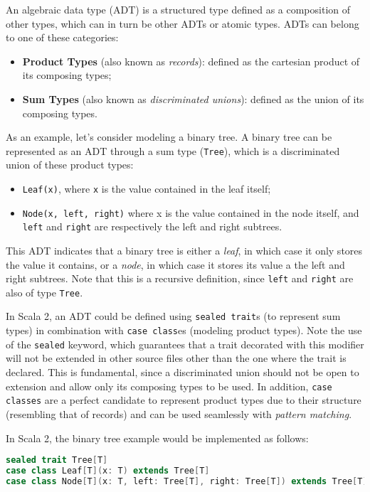 An algebraic data type (ADT) is a structured type defined as a composition of other types, which can in turn be other ADTs or atomic types.
%
ADTs can belong to one of these categories:
%
\begin{itemize}
    \item \textbf{Product Types} (also known as \textit{records}): defined as the cartesian product of its composing types;
    \item \textbf{Sum Types} (also known as \textit{discriminated unions}): defined as the union of its composing types.
\end{itemize}
%
As an example, let's consider modeling a binary tree.
%
A binary tree can be represented as an ADT through a sum type (\texttt{Tree}), which is a discriminated union of these product types:
%
\begin{itemize}
    \item \texttt{Leaf(x)}, where \texttt{x} is the value contained in the leaf itself;
    \item \texttt{Node(x, left, right)} where x is the value contained in the node itself, and \texttt{left} and \texttt{right} are respectively the left and right subtrees.
\end{itemize}
%
This ADT indicates that a binary tree is either a \textit{leaf}, in which case it only stores the value it contains, or a \textit{node}, in which case it stores its value a the left and right subtrees.
%
Note that this is a recursive definition, since \texttt{left} and \texttt{right} are also of type \texttt{Tree}.

In Scala 2, an ADT could be defined using \texttt{sealed trait}s (to represent sum types) in combination with \texttt{case class}es (modeling product types).
%
Note the use of the \texttt{sealed} keyword, which guarantees that a trait decorated with this modifier will not be extended in other source files other than the one where the trait is declared.
%
This is fundamental, since a discriminated union should not be open to extension and allow only its composing types to be used.
%
In addition, \texttt{case classes} are a perfect candidate to represent product types due to their structure (resembling that of records) and can be used seamlessly with \textit{pattern matching}.

In Scala 2, the binary tree example would be implemented as follows:
%
\begin{lstlisting}[frame=single, language=scala]
sealed trait Tree[T]
case class Leaf[T](x: T) extends Tree[T]
case class Node[T](x: T, left: Tree[T], right: Tree[T]) extends Tree[T]
\end{lstlisting}

